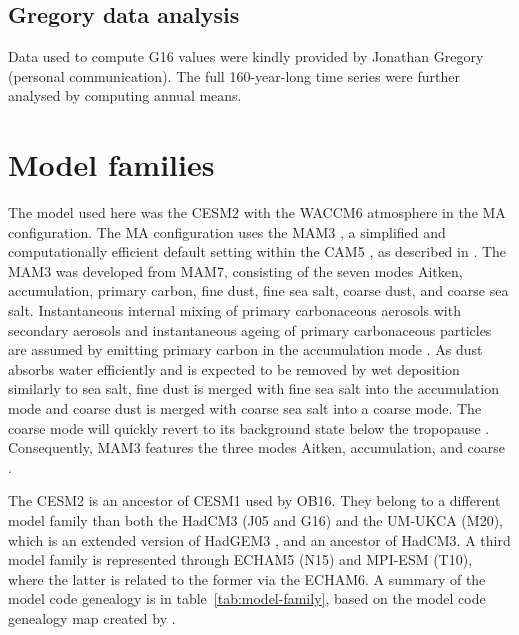 \documentclass[draft]{agujournal2019}
\begin{document}
  \subsection{Gregory data analysis}

  \label{ap:g16}

  Data used to compute G16 values were kindly provided by Jonathan Gregory (personal
  communication). The full 160-year-long time series were further analysed by computing
  annual means.

  \section{Model families}

  The model used here was the CESM2 with the WACCM6 atmosphere in the MA configuration.
  The MA configuration uses the MAM3 \cite{gettleman2019}, a simplified and
  computationally efficient default setting within the CAM5 \cite{liu2016}, as described
  in . The MAM3 was developed from MAM7, consisting of the seven modes
  Aitken, accumulation, primary carbon, fine dust, fine sea salt, coarse dust, and
  coarse sea salt. Instantaneous internal mixing of primary carbonaceous aerosols with
  secondary aerosols and instantaneous ageing of primary carbonaceous particles are
  assumed by emitting primary carbon in the accumulation mode \cite{liu2016}. As dust
  absorbs water efficiently and is expected to be removed by wet deposition similarly to
  sea salt, fine dust is merged with fine sea salt into the accumulation mode and coarse
  dust is merged with coarse sea salt into a coarse mode. The coarse mode will quickly
  revert to its background state below the tropopause \cite{liu2012}. Consequently, MAM3
  features the three modes Aitken, accumulation, and coarse \cite{liu2016}.

  The CESM2 is an ancestor of CESM1 used by OB16. They belong to a different model
  family than both the HadCM3 (J05 and G16) and the UM-UKCA (M20), which is an extended
  version of HadGEM3 \cite{dhomse2014}, and an ancestor of HadCM3. A third model family
  is represented through ECHAM5 (N15) and MPI-ESM (T10), where the latter is related to
  the former via the ECHAM6. A summary of the model code genealogy is in
  table~\ref{tab:model-family}, based on the model code genealogy map created by
  .
\end{document}
